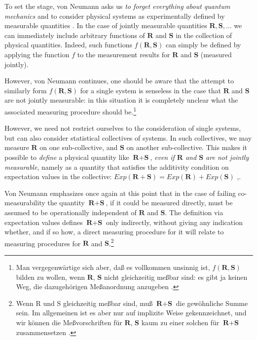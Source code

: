 \documentclass[11pt]{article}
\begin{document}
To set the stage, von Neumann asks us \emph{to forget everything about quantum mechanics} and to consider physical systems as experimentally defined by measurable quantities \cite[p.\@ 158]{VN1}. In the case of jointly measurable quantities $ \textbf{R}, \textbf{S},...$ we can immediately include arbitrary functions of $\textbf{R}$ and $\textbf{S}$ in the collection of physical quantities. Indeed, such functions $f(\textbf{R},\textbf{S})$ can simply be defined by applying the function $f$ to the measurement results for $\textbf{R}$ and $\textbf{S}$ (measured jointly).

However, von Neumann continues, one should be aware that the attempt to similarly form $f(\textbf{R},\textbf{S})$ for a single system is senseless in the case that $\textbf{R}$ and $\textbf{S}$ are not jointly measurable: in this situation it is completely unclear what the associated measuring procedure should be.\footnote{Man vergegenw\"{a}rtige sich aber, da{\ss} es vollkommen unsinnig ist, $f(\textbf{R},\textbf{S})$ bilden zu wollen, wenn $\textbf{R}$, $\textbf{S}$ nicht gleichzeitig me{\ss}bar sind: es gibt ja keinen Weg, die dazugeh\"{o}rigen Me{\ss}anordnung anzugeben \cite[p.\@ 158]{VN1}.}

However, we need not restrict ourselves to the consideration of single systems, but can also consider statistical collectives of systems. In such collectives, we may measure $\textbf{R}$ on one sub-collective, and $\textbf{S}$ on another sub-collective. This makes it possible to \emph{define} a physical quantity like $\textbf{R} + \textbf{S}$, \emph{even if $\textbf{R}$ and $\textbf{S}$ are not jointly measurable}, namely as a quantity that satisfies the additivity condition on expectation values in the collective: $Exp(\textbf{R}+\textbf{S}) = Exp(\textbf{R}) + Exp(\textbf{S})$ \cite[p.\@ 164]{VN1},\cite{bub}.

Von Neumann emphasizes once again at this point that in the case of failing co-measurability the quantity $\textbf{R}+\textbf{S}$, if it could be measured directly, must be assumed to be operationally independent of $\textbf{R}$ and $\textbf{S}$. The definition via expectation values defines $\textbf{R} + \textbf{S}$ only indirectly, without giving any indication whether, and if so how, a direct measuring procedure for it will relate to measuring procedures for $\textbf{R}$ and $\textbf{S}$.\footnote{Wenn R und S gleichzeitig me{\ss}bar sind, mu{\ss} $\textbf{R} + \textbf{S}$ die gew\"{o}hnliche Summe sein. Im allgemeinen ist es aber nur auf implizite Weise gekennzeichnet, und wir k\"{o}nnen die Me{\ss}vorschriften f\"{u}r $\textbf{R}$, $\textbf{S}$ kaum zu einer solchen f\"{u}r $\textbf{R} + \textbf{S}$ zusammensetzen \cite[p.\@ 164]{VN1}.}
\end{document}
